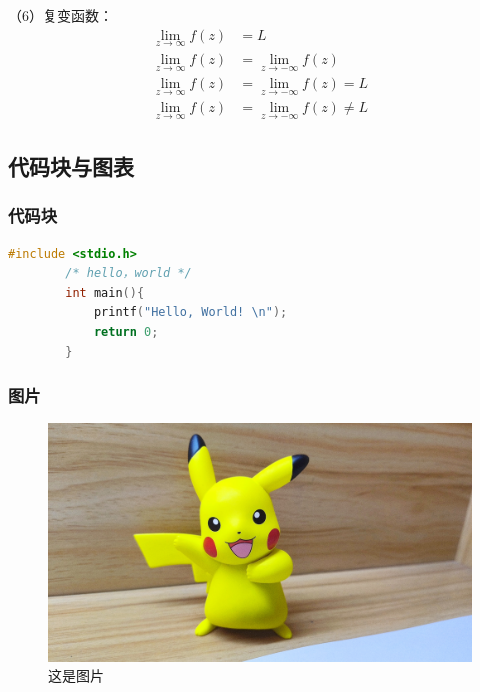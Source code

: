 \begin{ujnbody}
    （6）复变函数：
    \begin{equation}
        \begin{split}
            \lim_{z \to \infty}f(z) &= L \\
            \lim_{z \to \infty}f(z) &= \lim_{z \to -\infty}f(z) \\
            \lim_{z \to \infty}f(z) &= \lim_{z \to -\infty}f(z) = L \\
            \lim_{z \to \infty}f(z) &= \lim_{z \to -\infty}f(z) \neq L
        \end{split}
    \end{equation}
    \subsection{代码块与图表}
    \subsubsection{代码块}
    \begin{lstlisting}[language=C]
        #include <stdio.h>
        /* hello，world */
        int main(){
            printf("Hello, World! \n"); 
            return 0;
        }
    \end{lstlisting}
    \subsubsection{图片}
    \begin{figure}[htbp]
        \centering
        \includegraphics[scale=0.1]{figures/pikachu.jpg}
        \caption{这是图片}
        \label{fig:2}
    \end{figure}

\end{ujnbody}
